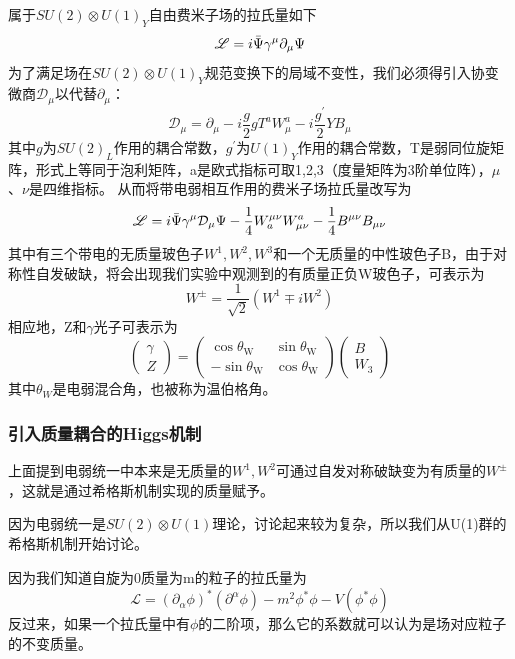 属于$SU(2)\otimes U(1)_Y$自由费米子场的拉氏量如下
\begin{equation}
    \mathscr{L}=i\Bar{\Psi}\gamma^\mu\partial_\mu \Psi
\end{equation}
为了满足场在$SU(2)\otimes U(1)_Y$规范变换下的局域不变性，我们必须得引入协变微商$\mathcal{D}_\mu$以代替$\partial_\mu$：
\begin{equation}
    \mathcal{D}_\mu=\partial_\mu -i\frac{g}{2}gT^aW_\mu^a-i\frac{g^\prime}{2} Y B_\mu
\end{equation}
其中$g$为$SU(2)_L$作用的耦合常数，$g^\prime$为$U(1)_Y$作用的耦合常数，T是弱同位旋矩阵，形式上等同于泡利矩阵，a是欧式指标可取1,2,3（度量矩阵为3阶单位阵），$\mu$、$\nu$是四维指标。
从而将带电弱相互作用的费米子场拉氏量改写为
\begin{equation}
    \mathscr{L}=i\Bar{\Psi}\gamma^\mu\mathcal{D}_\mu \Psi-\frac{1}{4}W^{\mu\nu}_a W^a_{\mu\nu}-\frac{1}{4}B^{\mu\nu}B_{\mu\nu}
\end{equation}
其中有三个带电的无质量玻色子$W^1,W^2,W^3$和一个无质量的中性玻色子B，由于对称性自发破缺，将会出现我们实验中观测到的有质量正负W玻色子，可表示为
\begin{equation}
    W^{\pm}=\frac{1}{\sqrt{2}}(W^1\mp iW^2)
\end{equation}
相应地，Z和$\gamma$光子可表示为
\begin{equation}
    \begin{pmatrix}
\gamma \\
Z \end{pmatrix} = \begin{pmatrix}
\cos \theta_\text{W} & \sin \theta_\text{W} \\
-\sin \theta_\text{W} & \cos \theta_\text{W} \end{pmatrix} \begin{pmatrix}
B \\
W_3 \end{pmatrix}
\end{equation}
其中$\theta_W$是电弱混合角，也被称为温伯格角。

\subsubsection{引入质量耦合的Higgs机制}
上面提到电弱统一中本来是无质量的$W^1,W^2$可通过自发对称破缺变为有质量的$W^\pm$，这就是通过希格斯机制实现的质量赋予。

因为电弱统一是$SU(2)\otimes U(1)$理论，讨论起来较为复杂，所以我们从U(1)群的希格斯机制开始讨论。

因为我们知道自旋为0质量为m的粒子的拉氏量为
\begin{equation}
    \mathcal{L}=(\partial_{\alpha} \phi)^*(\partial^{\alpha} \phi)-m^2\phi^*\phi -V(\phi^*\phi)
\end{equation}
反过来，如果一个拉氏量中有$\phi$的二阶项，那么它的系数就可以认为是场对应粒子的不变质量。

